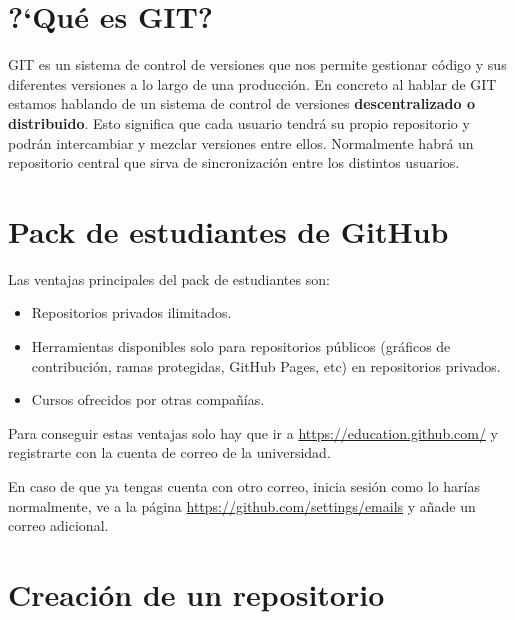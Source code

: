 
\section{?`Qué es GIT?}

GIT es un sistema de control de versiones que nos permite gestionar código y sus diferentes versiones a lo largo de una producción. En concreto al hablar de GIT estamos hablando de un sistema de control de versiones \textbf{descentralizado o distribuido}. Esto significa que cada usuario tendrá su propio repositorio y podrán intercambiar y mezclar versiones entre ellos. Normalmente habrá un repositorio central que sirva de sincronización entre los distintos usuarios.

\section{Pack de estudiantes de GitHub}

Las ventajas principales del pack de estudiantes son:
\begin{itemize}
    \item Repositorios privados ilimitados.
    \item Herramientas disponibles solo para repositorios públicos (gráficos de contribución, ramas protegidas, GitHub Pages, etc) en repositorios privados.
    \item Cursos ofrecidos por otras compañías.
\end{itemize}

Para conseguir estas ventajas solo hay que ir a \url{https://education.github.com/} y registrarte con la cuenta de correo de la universidad.

En caso de que ya tengas cuenta con otro correo, inicia sesión como lo harías normalmente, ve a la página \url{https://github.com/settings/emails} y añade un correo adicional.

\section{Creación de un repositorio}

